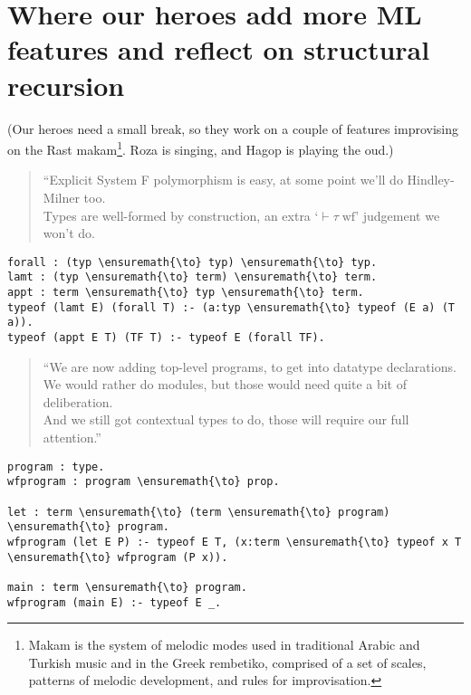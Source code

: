 \section{Where our heroes add more ML features and reflect on structural
recursion}\label{where-our-heroes-add-more-ml-features-and-reflect-on-structural-recursion}

\begin{scenecomment}
(Our heroes need a small break, so they work on a couple of features improvising on the Rast makam\footnote{Makam is the system of melodic modes used in traditional Arabic and Turkish music and in the Greek rembetiko, comprised of a set of scales, patterns of melodic development, and rules for improvisation.}. Roza is singing, and Hagop is playing the oud.)
\end{scenecomment}

\begin{verse}
``Explicit System F polymorphism is easy, at some point we'll do Hindley-Milner too. \\
Types are well-formed by construction, an extra `$\vdash \tau \; \text{wf}$' judgement we won't do.
\end{verse}

\begin{verbatim}
forall : (typ \ensuremath{\to} typ) \ensuremath{\to} typ.
lamt : (typ \ensuremath{\to} term) \ensuremath{\to} term.
appt : term \ensuremath{\to} typ \ensuremath{\to} term.
typeof (lamt E) (forall T) :- (a:typ \ensuremath{\to} typeof (E a) (T a)).
typeof (appt E T) (TF T) :- typeof E (forall TF).
\end{verbatim}

\begin{verse}
``We are now adding top-level programs, to get into datatype declarations. \\
We would rather do modules, but those would need quite a bit of deliberation. \\
And we still got contextual types to do, those will require our full attention.''
\end{verse}

\begin{verbatim}
program : type.
wfprogram : program \ensuremath{\to} prop.

let : term \ensuremath{\to} (term \ensuremath{\to} program) \ensuremath{\to} program.
wfprogram (let E P) :- typeof E T, (x:term \ensuremath{\to} typeof x T \ensuremath{\to} wfprogram (P x)).

main : term \ensuremath{\to} program.
wfprogram (main E) :- typeof E _.
\end{verbatim}

